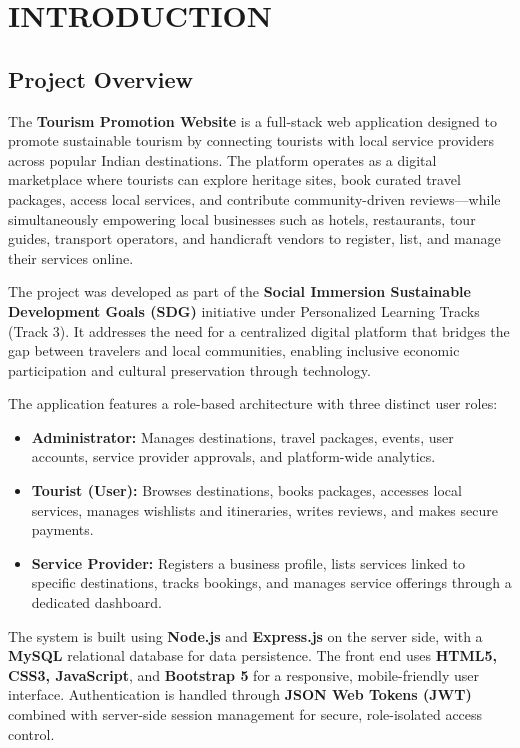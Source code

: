 \chapter{INTRODUCTION}

\section{Project Overview}

The \textbf{Tourism Promotion Website} is a full-stack web application designed to promote sustainable tourism by connecting tourists with local service providers across popular Indian destinations. The platform operates as a digital marketplace where tourists can explore heritage sites, book curated travel packages, access local services, and contribute community-driven reviews---while simultaneously empowering local businesses such as hotels, restaurants, tour guides, transport operators, and handicraft vendors to register, list, and manage their services online.

The project was developed as part of the \textbf{Social Immersion Sustainable Development Goals (SDG)} initiative under Personalized Learning Tracks (Track 3). It addresses the need for a centralized digital platform that bridges the gap between travelers and local communities, enabling inclusive economic participation and cultural preservation through technology.

The application features a role-based architecture with three distinct user roles:
\begin{itemize}[leftmargin=2em]
    \item \textbf{Administrator:} Manages destinations, travel packages, events, user accounts, service provider approvals, and platform-wide analytics.
    \item \textbf{Tourist (User):} Browses destinations, books packages, accesses local services, manages wishlists and itineraries, writes reviews, and makes secure payments.
    \item \textbf{Service Provider:} Registers a business profile, lists services linked to specific destinations, tracks bookings, and manages service offerings through a dedicated dashboard.
\end{itemize}

The system is built using \textbf{Node.js} and \textbf{Express.js} on the server side, with a \textbf{MySQL} relational database for data persistence. The front end uses \textbf{HTML5, CSS3, JavaScript}, and \textbf{Bootstrap 5} for a responsive, mobile-friendly user interface. Authentication is handled through \textbf{JSON Web Tokens (JWT)} combined with server-side session management for secure, role-isolated access control.

